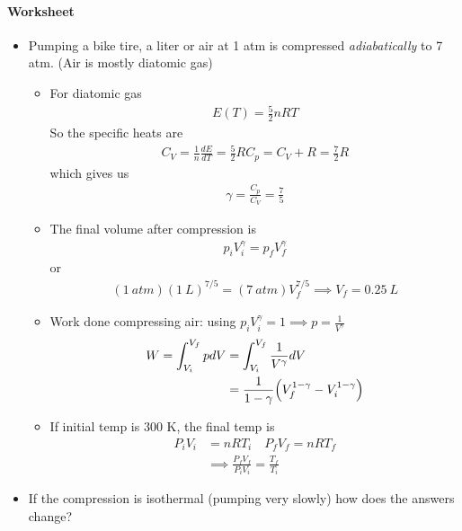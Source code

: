 \documentclass[../main.tex]{subfiles}
\begin{document}
\paragraph{Worksheet}
\begin{itemize}
    \item Pumping a bike tire, a liter or air at 1 atm is compressed \textit{adiabatically} to 7 atm. (Air is mostly diatomic gas)
    \begin{itemize}
        \item For diatomic gas
        \begin{align*}
            E(T) = \frac{5}{2} nRT
        \end{align*}
        So the specific heats are
        \begin{align*}
            C_V = \frac{1}{n} \frac{dE}{dT} = \frac{5}{2} R
            C_p = C_V + R = \frac{7}{2} R
        \end{align*}
        which gives us
        \begin{align*}
            \gamma = \frac{C_p}{C_V} = \frac{7}{5}
        \end{align*}
        \item The final volume after compression is
        \begin{align*}
            p_i V_i^\gamma = p_f V_f^\gamma
        \end{align*}
        or
        \begin{align*}
            (\qty{1}{atm}) (\qty{1}{L})^{7/5} = (\qty{7}{atm}) V_f^{7/5} \implies V_f = \qty{0.25}{L}
        \end{align*}
        \item Work done compressing air: using $p_i V_i^\gamma = 1 \implies p = \frac{1}{V^\gamma}$
        \begin{align*}
            W = \int_{V_i}^{V_f} p dV &= \int_{V_i}^{V_f} \frac{1}{V^\gamma} dV \\
            &= \frac{1}{1-\gamma} \qt(V_f^{1-\gamma} - V_i^{1-\gamma}) \\
        \end{align*}
        \item If initial temp is $300$ K, the final temp is
        \begin{align*}
            P_i V_i &= nR T_i \quad P_f V_f = nR T_f \\
            &\implies \frac{P_f V_f}{P_i V_i} = \frac{T_f}{T_i}
        \end{align*}
    \end{itemize}
    \item If the compression is isothermal (pumping very slowly) how does the answers change?
\end{itemize}
\end{document}
